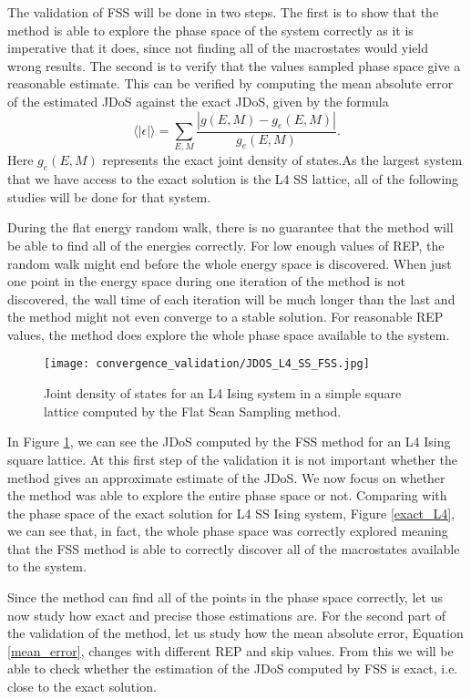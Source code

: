 	The validation of FSS will be done in two steps. The first is to show that the method is able to explore the phase space of the system correctly as it is imperative that it does, since not finding all of the macrostates would yield wrong results. The second is to verify that the values sampled phase space give a reasonable estimate. This can be verified by computing the mean absolute error of the estimated JDoS against the exact JDoS, given by the formula
\begin{equation}\label{mean_error}
	  \langle |\epsilon|\rangle = \sum_{E, M} \frac{|g(E, M) - g_e(E, M)|}{g_e(E, M)}.
\end{equation} 
Here $g_e(E, M)$ represents the exact joint density of states.As the largest system that we have access to the exact solution is the L4 SS lattice, all of the following studies will be done for that system.

	During the flat energy random walk, there is no guarantee that the method will  be able to find all of the energies correctly. For low enough values of REP, the random walk might end before the whole energy space is discovered. When just one point in the energy space during one iteration of the method is not discovered, the wall time of each iteration will be much longer than the last and the method might not even converge to a stable solution. For reasonable REP values, the method does explore the whole phase space available to the system.
\begin{figure}[h]
	\centering
	\texttt{[image: convergence\_validation/JDOS\_L4\_SS\_FSS.jpg]}
			
	\caption{Joint density of states for an L4 Ising system in a simple square lattice computed by the Flat Scan Sampling method. }
	\label{jdos_est}
\end{figure}	

\pagebreak
	
	In Figure \ref{jdos_est}, we can see the JDoS computed by the FSS method for an L4 Ising square lattice. At this first step of the validation it is not important whether the method gives an approximate estimate of the JDoS. We now focus on whether the method was able to explore the entire phase space or not. 
Comparing with the phase space of the exact solution for L4 SS Ising system, Figure \ref{exact_L4}, we can see that, in fact, the whole phase space was correctly explored meaning that the FSS method is able to correctly discover all of the macrostates available to the system. 

	Since the method can find all of the points in the phase space correctly, let us now study how exact and precise those estimations are. For the second part of the validation of the method, let us study how the mean absolute error, Equation \ref{mean_error}, changes with different REP and skip values. From this we will be able to check whether the estimation of the JDoS computed by FSS is exact, i.e. close to the exact solution.

